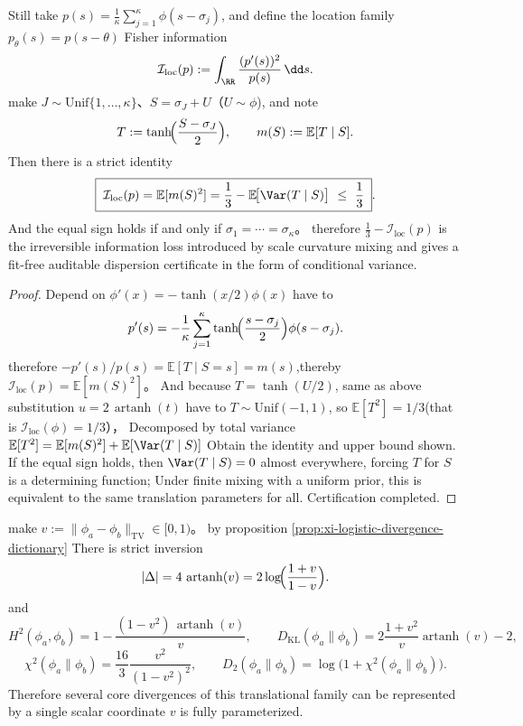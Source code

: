 \begin{proposition}\label{prop:xi-logistic-fisher-information-deficit}
Still take
\(
p(s)=\frac{1}{\kappa}\sum_{j=1}^{\kappa}\phi(s-\sigma_j)
\), and define the location family \(p_\theta(s)=p(s-\theta)\) Fisher information
\[
\mathcal I_{\mathrm{loc}}(p):=\int_{\RR}\frac{(p'(s))^{2}}{p(s)}\,\dd s.
\]
make \(J\sim\mathrm{Unif}\{1,\dots,\kappa\}\)、\(S=\sigma_J+U\)（\(U\sim\phi\)), and note
\[
T:=\tanh\!\Bigl(\frac{S-\sigma_J}{2}\Bigr),
\qquad
m(S):=\mathbb E[T\mid S].
\]
Then there is a strict identity
\[
\boxed{\;
\mathcal I_{\mathrm{loc}}(p)=\mathbb E[m(S)^{2}]
=\frac{1}{3}-\mathbb E\!\bigl[\Var(T\mid S)\bigr]
\ \le\ \frac{1}{3}\; }.
\]
And the equal sign holds if and only if \(\sigma_1=\cdots=\sigma_\kappa\)。
therefore \( \frac{1}{3}-\mathcal I_{\mathrm{loc}}(p)\) is the irreversible information loss introduced by scale curvature mixing and gives a fit-free auditable dispersion certificate in the form of conditional variance.
\end{proposition}
\begin{proof}
Depend on \(\phi'(x)=-\tanh(x/2)\phi(x)\) have to
\[
p'(s)=-\frac{1}{\kappa}\sum_{j=1}^{\kappa}\tanh\!\Bigl(\frac{s-\sigma_j}{2}\Bigr)\phi(s-\sigma_j).
\]
therefore
\(
-p'(s)/p(s)=\mathbb E[T\mid S=s]=m(s)
\),thereby
\(
\mathcal I_{\mathrm{loc}}(p)=\mathbb E[m(S)^{2}]
\)。
And because \(T=\tanh(U/2)\), same as above substitution \(u=2\,\operatorname{artanh}(t)\) have to \(T\sim\mathrm{Unif}(-1,1)\), so \(\mathbb E[T^{2}]=1/3\)(that is \(\mathcal I_{\mathrm{loc}}(\phi)=1/3\)），
Decomposed by total variance
\(
\mathbb E[T^{2}]=\mathbb E[m(S)^{2}]+\mathbb E[\Var(T\mid S)]
\)
Obtain the identity and upper bound shown.
If the equal sign holds, then \(\Var(T\mid S)=0\) almost everywhere, forcing \(T\) for \(S\) is a determining function;
Under finite mixing with a uniform prior, this is equivalent to the same translation parameters for all. Certification completed.
\end{proof}

\begin{remark}\label{rem:xi-logistic-tv-coordinate-parametrization}
make \(v:=\|\phi_a-\phi_b\|_{\mathrm{TV}}\in[0,1)\)。
by proposition \ref{prop:xi-logistic-divergence-dictionary} There is strict inversion
\[
|\Delta|=4\,\operatorname{artanh}(v)=2\log\!\Bigl(\frac{1+v}{1-v}\Bigr).
\]
and
\[
H^{2}(\phi_a,\phi_b)
=1-\frac{(1-v^{2})\,\operatorname{artanh}(v)}{v},
\qquad
D_{\mathrm{KL}}(\phi_a\|\phi_b)
=2\frac{1+v^{2}}{v}\operatorname{artanh}(v)-2,
\]
\[
\chi^{2}(\phi_a\|\phi_b)
=\frac{16}{3}\frac{v^{2}}{(1-v^{2})^{2}},
\qquad
D_{2}(\phi_a\|\phi_b)
=\log\!\bigl(1+\chi^{2}(\phi_a\|\phi_b)\bigr).
\]
Therefore several core divergences of this translational family can be represented by a single scalar coordinate \(v\) is fully parameterized.
\end{remark}

